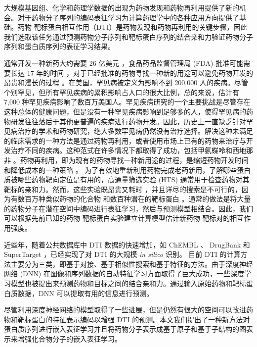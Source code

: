 大规模基因组、化学和药理学数据的出现为药物发现和药物再利用提供了新的机会。对于药物分子序列的编码表征学习为计算药理学中的各种应用方向提供了基础。药物-靶标蛋白相互作用（DTI）是药物发现和药物再利用的关键步骤，因此我们选取该任务通过预测药物分子序列和靶标蛋白序列的结合亲和力验证药物分子序列和蛋白质序列的表征学习结果。

通常开发一种新药大约需要 26 亿美元 \cite{Mullard2014New}，食品药品监督管理局 (FDA) 批准可能需要长达 17 年的时间 \cite{ashburn2004drug, roses2008pharmacogenetics}，对于已经批准的药物寻找一种新的用途可以避免药物开发的昂贵和漫长的过程 \cite{ashburn2004drug, strittmatter2014overcoming}。在美国，罕见病被定义为影响不到 200,000 人的疾病。尽管个别罕见，但所有罕见疾病的累积影响占人口的很大比例，总的来说，估计有 7,000 种罕见疾病影响了数百万美国人。罕见疾病研究的一个主要挑战是尽管存在这种总体的健康问题，但是没有一种罕见疾病影响到足够多的人，使得罕见病的药物研发往往落后于其他更普遍的疾病进行药物开发。因此，历史上一直缺乏针对罕见病治疗的学术和药物研究，绝大多数罕见病仍然没有治疗选择。解决这种未满足的临床需求的一种方法是通过药物再利用，或者使用市场上已有的药物来治疗与开发治疗不同的疾病。这种范式在许多情况下都取得了成功，包括甲氨蝶呤和西地那非 \cite{hashkes2014methotrexate, ghofrani2006sildenafil}。药物再利用，即为现有的药物寻找一种新用途的过程，是缩短药物开发时间和降低成本的一种策略 \cite{nosengo2016new}。 为了有效地重新利用药物完成老药新用，了解哪些蛋白质被哪些药物靶向定位是有用的，高通量筛选实验 (HTS) 通常用于检查药物对其靶标的亲和力。然而，这些实验既昂贵又耗时 \cite{cohen2002protein, noble2004protein}，并且详尽的搜索是不可行的，因为有数百万种类似药物的化合物 \cite{deshpande2005frequent}和数百种潜在的靶标蛋白 \cite{manning2002protein, stachel2014maximizing}。通常的做法是将大量的药物分子在潜在空间中编码进行表征学习，然后与预测模型相结合。因此，我们可以根据先前已知的药物-靶标蛋白实验建立计算模型估计新药物-靶标对的相互作用强度。

近些年，随着公共数据库中 DTI 数据的快速增加，如 ChEMBL \cite{gaulton2012chembl} 、 DrugBank \cite{wishart2008drugbank} 和 SuperTarget \cite{gunther2007supertarget} ，已经实现了对 DTI 的大规模 \textit{in silico} 识别。 目前 DTI 的计算方法主要分为三类，即基于对接、基于相似性搜索和基于特征的方法。由于深度神经网络 (DNN) 在图像和序列数据的自动特征学习方面取得了巨大成功，一些深度学习模型也被提出来预测药物和目标之间的结合亲和力。通过输入原始药物和靶标蛋白质数据，DNN 可以提取有用的信息进行预测。

尽管利用深度神经网络的模型取得了一些进展，但是仍然有很大的空间可以改进药物和靶标蛋白的特征表示编码以增强 DTI 的预测。本文我们提出了一种新方法对蛋白质序列进行嵌入表征学习并且将药物分子表示成基于原子和基于子结构的图表示来增强化合物分子的嵌入表征学习。


